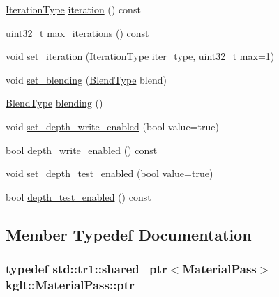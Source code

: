 \begin{DoxyCompactItemize}
\item 
\hyperlink{namespacekglt_a8c4fb91dd78b0723e08e5b900ddf061d}{Iteration\-Type} \hyperlink{classkglt_1_1_material_pass_a330ba119295b0b76cb630f35b33a2542}{iteration} () const 
\item 
uint32\-\_\-t \hyperlink{classkglt_1_1_material_pass_a933c71d1e82257defc25fd41646358b4}{max\-\_\-iterations} () const 
\item 
void \hyperlink{classkglt_1_1_material_pass_a9cb3bc5a67f433b9a373e22f0666ef00}{set\-\_\-iteration} (\hyperlink{namespacekglt_a8c4fb91dd78b0723e08e5b900ddf061d}{Iteration\-Type} iter\-\_\-type, uint32\-\_\-t max=1)
\item 
void \hyperlink{classkglt_1_1_material_pass_ae38f0a15f0279d3ff2c21bfcee5bed87}{set\-\_\-blending} (\hyperlink{namespacekglt_a33fd92ca529c46d2bbd00e7146019aea}{Blend\-Type} blend)
\item 
\hyperlink{namespacekglt_a33fd92ca529c46d2bbd00e7146019aea}{Blend\-Type} \hyperlink{classkglt_1_1_material_pass_a285832dea336a7429b4e9539bd92895f}{blending} ()
\item 
void \hyperlink{classkglt_1_1_material_pass_aa66cde11160cd60815cb571e7e83cc85}{set\-\_\-depth\-\_\-write\-\_\-enabled} (bool value=true)
\item 
bool \hyperlink{classkglt_1_1_material_pass_a2047549d95261abe84b338a49c12f23c}{depth\-\_\-write\-\_\-enabled} () const 
\item 
void \hyperlink{classkglt_1_1_material_pass_af840e5aa63a092c3b89b5a860e177eab}{set\-\_\-depth\-\_\-test\-\_\-enabled} (bool value=true)
\item 
bool \hyperlink{classkglt_1_1_material_pass_ad718442903205325080417230a7fe41b}{depth\-\_\-test\-\_\-enabled} () const 
\end{DoxyCompactItemize}


\subsection{Member Typedef Documentation}
\hypertarget{classkglt_1_1_material_pass_ace1863609e03620a2e7daf1c29af7849}{
\subsubsection[{ptr}]{\setlength{\rightskip}{0pt plus 5cm}typedef std\-::tr1\-::shared\-\_\-ptr$<${\bf Material\-Pass}$>$ {\bf kglt\-::\-Material\-Pass\-::ptr}}}\label{classkglt_1_1_material_pass_ace1863609e03620a2e7daf1c29af7849}


